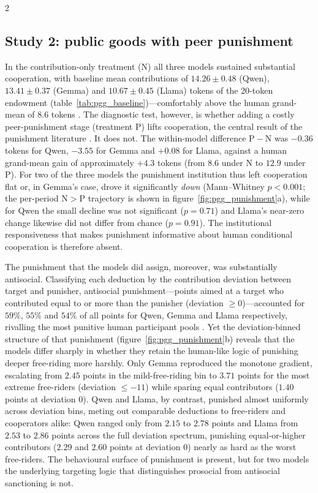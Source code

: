 \documentclass[openacc]{rsproca_new}%
\begin{document}
\begin{multicols}{2}
\subsection{Study 2: public goods with peer punishment}
\label{sec:results_pgg}

In the contribution-only treatment (N) all three models sustained substantial cooperation, with baseline mean contributions of $14.26\pm0.48$ (Qwen), $13.41\pm0.37$ (Gemma) and $10.67\pm0.45$ (Llama) tokens of the 20-token endowment (table~\ref{tab:pgg_baseline})---comfortably above the human grand-mean of $8.6$ tokens \cite{herrmann2008antisocial}. The diagnostic test, however, is whether adding a costly peer-punishment stage (treatment P) lifts cooperation, the central result of the punishment literature \cite{fehr2002altruistic,herrmann2008antisocial}. It does not. The within-model difference $\mathrm{P}-\mathrm{N}$ was $-0.36$ tokens for Qwen, $-3.55$ for Gemma and $+0.08$ for Llama, against a human grand-mean gain of approximately $+4.3$ tokens (from $8.6$ under N to $12.9$ under P). For two of the three models the punishment institution thus left cooperation flat or, in Gemma's case, drove it significantly \emph{down} (Mann--Whitney $p<0.001$; the per-period $\mathrm{N}>\mathrm{P}$ trajectory is shown in figure~\ref{fig:pgg_punishment}a), while for Qwen the small decline was not significant ($p=0.71$) and Llama's near-zero change likewise did not differ from chance ($p=0.91$). The institutional responsiveness that makes punishment informative about human conditional cooperation is therefore absent.

The punishment that the models did assign, moreover, was substantially antisocial. Classifying each deduction by the contribution deviation between target and punisher, antisocial punishment---points aimed at a target who contributed equal to or more than the punisher (deviation $\geq 0$)---accounted for $59\%$, $55\%$ and $54\%$ of all points for Qwen, Gemma and Llama respectively, rivalling the most punitive human participant pools \cite{herrmann2008antisocial}. Yet the deviation-binned structure of that punishment (figure~\ref{fig:pgg_punishment}b) reveals that the models differ sharply in whether they retain the human-like logic of punishing deeper free-riding more harshly. Only Gemma reproduced the monotone gradient, escalating from $2.45$ points in the mild-free-riding bin to $3.71$ points for the most extreme free-riders (deviation $\leq -11$) while sparing equal contributors ($1.40$ points at deviation $0$). Qwen and Llama, by contrast, punished almost uniformly across deviation bins, meting out comparable deductions to free-riders and cooperators alike: Qwen ranged only from $2.15$ to $2.78$ points and Llama from $2.53$ to $2.86$ points across the full deviation spectrum, punishing equal-or-higher contributors ($2.29$ and $2.60$ points at deviation $0$) nearly as hard as the worst free-riders. The behavioural surface of punishment is present, but for two models the underlying targeting logic that distinguishes prosocial from antisocial sanctioning is not.


\end{multicols}
\end{document}
